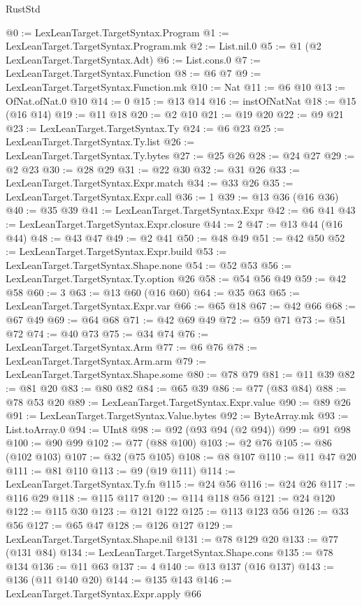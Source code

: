 \begin{lexlean}{RustStd}
\begin{coremodule}
@0 := LexLeanTarget.TargetSyntax.Program
@1 := LexLeanTarget.TargetSyntax.Program.mk
@2 := List.nil.{0}
@5 := @1 (@2 LexLeanTarget.TargetSyntax.Adt)
@6 := List.cons.{0}
@7 := LexLeanTarget.TargetSyntax.Function
@8 := @6 @7
@9 := LexLeanTarget.TargetSyntax.Function.mk
@10 := Nat
@11 := @6 @10
@13 := OfNat.ofNat.{0} @10
@14 := 0
@15 := @13 @14
@16 := instOfNatNat
@18 := @15 (@16 @14)
@19 := @11 @18
@20 := @2 @10
@21 := @19 @20
@22 := @9 @21
@23 := LexLeanTarget.TargetSyntax.Ty
@24 := @6 @23
@25 := LexLeanTarget.TargetSyntax.Ty.list
@26 := LexLeanTarget.TargetSyntax.Ty.bytes
@27 := @25 @26
@28 := @24 @27
@29 := @2 @23
@30 := @28 @29
@31 := @22 @30
@32 := @31 @26
@33 := LexLeanTarget.TargetSyntax.Expr.match
@34 := @33 @26
@35 := LexLeanTarget.TargetSyntax.Expr.call
@36 := 1
@39 := @13 @36 (@16 @36)
@40 := @35 @39
@41 := LexLeanTarget.TargetSyntax.Expr
@42 := @6 @41
@43 := LexLeanTarget.TargetSyntax.Expr.closure
@44 := 2
@47 := @13 @44 (@16 @44)
@48 := @43 @47
@49 := @2 @41
@50 := @48 @49
@51 := @42 @50
@52 := LexLeanTarget.TargetSyntax.Expr.build
@53 := LexLeanTarget.TargetSyntax.Shape.none
@54 := @52 @53
@56 := LexLeanTarget.TargetSyntax.Ty.option @26
@58 := @54 @56 @49
@59 := @42 @58
@60 := 3
@63 := @13 @60 (@16 @60)
@64 := @35 @63
@65 := LexLeanTarget.TargetSyntax.Expr.var
@66 := @65 @18
@67 := @42 @66
@68 := @67 @49
@69 := @64 @68
@71 := @42 @69 @49
@72 := @59 @71
@73 := @51 @72
@74 := @40 @73
@75 := @34 @74
@76 := LexLeanTarget.TargetSyntax.Arm
@77 := @6 @76
@78 := LexLeanTarget.TargetSyntax.Arm.arm
@79 := LexLeanTarget.TargetSyntax.Shape.some
@80 := @78 @79
@81 := @11 @39
@82 := @81 @20
@83 := @80 @82
@84 := @65 @39
@86 := @77 (@83 @84)
@88 := @78 @53 @20
@89 := LexLeanTarget.TargetSyntax.Expr.value
@90 := @89 @26
@91 := LexLeanTarget.TargetSyntax.Value.bytes
@92 := ByteArray.mk
@93 := List.toArray.{0}
@94 := UInt8
@98 := @92 (@93 @94 (@2 @94))
@99 := @91 @98
@100 := @90 @99
@102 := @77 (@88 @100)
@103 := @2 @76
@105 := @86 (@102 @103)
@107 := @32 (@75 @105)
@108 := @8 @107
@110 := @11 @47 @20
@111 := @81 @110
@113 := @9 (@19 @111)
@114 := LexLeanTarget.TargetSyntax.Ty.fn
@115 := @24 @56
@116 := @24 @26
@117 := @116 @29
@118 := @115 @117
@120 := @114 @118 @56
@121 := @24 @120
@122 := @115 @30
@123 := @121 @122
@125 := @113 @123 @56
@126 := @33 @56
@127 := @65 @47
@128 := @126 @127
@129 := LexLeanTarget.TargetSyntax.Shape.nil
@131 := @78 @129 @20
@133 := @77 (@131 @84)
@134 := LexLeanTarget.TargetSyntax.Shape.cons
@135 := @78 @134
@136 := @11 @63
@137 := 4
@140 := @13 @137 (@16 @137)
@143 := @136 (@11 @140 @20)
@144 := @135 @143
@146 := LexLeanTarget.TargetSyntax.Expr.apply @66

\end{coremodule}
\end{lexlean}
